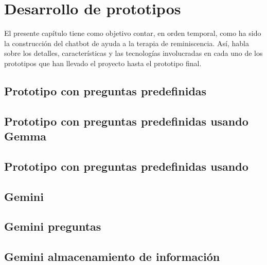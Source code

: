 \chapter{Desarrollo de prototipos}
\label{cap:Desarrollo de prototipos}
El presente capítulo tiene como objetivo contar, en orden temporal, como ha sido la construcción del chatbot de ayuda a la terapia de reminiscencia. Así, habla sobre los detalles, características y las tecnologías involucradas en cada uno de los prototipos que han llevado el proyecto hasta el prototipo final. 

\section{Prototipo con preguntas predefinidas}
\section{Prototipo con preguntas predefinidas usando Gemma}
\section{Prototipo con preguntas predefinidas usando}
\section{Gemini}
\section{Gemini preguntas}
\section{Gemini almacenamiento de información}
